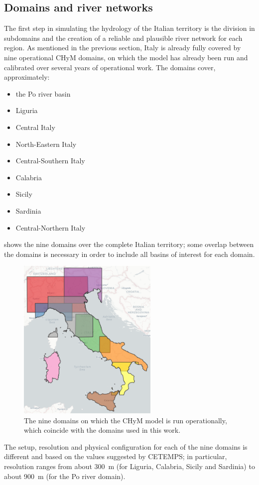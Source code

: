 \subsection{Domains and river networks}\label{sec:chym_riv_net}
The first step in simulating the hydrology of the Italian territory is the division in subdomains and the creation of a reliable and plausible river network for each region.
As mentioned in the previous section, Italy is already fully covered by nine operational CHyM domains, on which the model has already been run and calibrated over several years of operational work.
The domains cover, approximately:
\begin{itemize}
    \item the Po river basin
    \item Liguria
    \item Central Italy
    \item North-Eastern Italy
    \item Central-Southern Italy
    \item Calabria
    \item Sicily
    \item Sardinia
    \item Central-Northern Italy
\end{itemize}
 shows the nine domains over the complete Italian territory; some overlap between the domains is necessary in order to include all basins of interest for each domain.
\begin{figure}
    \centering
    \includegraphics[width=0.6\textwidth]{figures/regions_crop}
    \decoRule
    \caption[The nine CHyM domains]{
        The nine domains on which the CHyM model is run operationally, which coincide with the domains used in this work.
    } \label{fig:chym_regions}
\end{figure}
The setup, resolution and physical configuration for each of the nine domains is different and based on the values suggested by CETEMPS; in particular, resolution ranges from about \SI{300}{\meter} (for Liguria, Calabria, Sicily and Sardinia) to about \SI{900}{\meter} (for the Po river domain).

